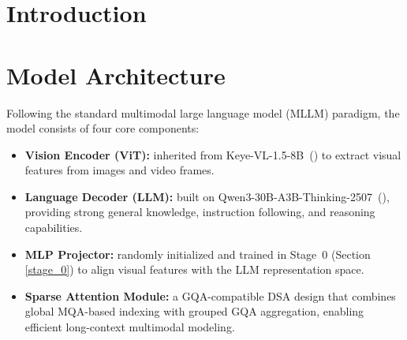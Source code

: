 \documentclass{article} %
\begin{document}


\newpage
{
  \tableofcontents
  \noindent\hrulefill
}
\newpage


\section{Introduction}



\section{Model Architecture}

 Following the standard multimodal large language model (MLLM) paradigm, the model consists of four core components:

\begin{itemize}
    \item \textbf{Vision Encoder (ViT):} inherited from Keye-VL-1.5-8B~(\cite{kwaikeye2025vl}) to extract visual features from images and video frames.
    \item \textbf{Language Decoder (LLM):} built on Qwen3-30B-A3B-Thinking-2507~(\cite{qwen3}), providing strong general knowledge, instruction following, and reasoning capabilities.
    \item \textbf{MLP Projector:} randomly initialized and trained in Stage~0 (Section \ref{stage_0}) to align visual features with the LLM representation space.
    \item \textbf{Sparse Attention Module:} a GQA-compatible DSA design that combines global MQA-based indexing with grouped GQA aggregation, enabling efficient long-context multimodal modeling.
\end{itemize}
\end{document}
